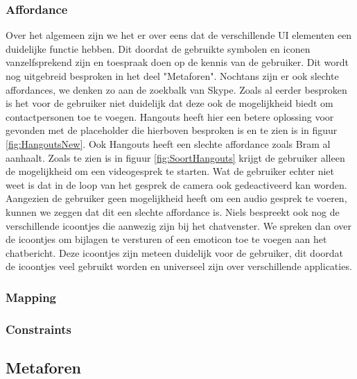 \documentclass[11pt]{article}
\begin{document}
\subsubsection{Affordance} 
Over het algemeen zijn we het er over eens dat de verschillende UI elementen een duidelijke functie hebben. Dit doordat de gebruikte symbolen en iconen vanzelfsprekend zijn en toespraak doen op de kennis van de gebruiker. Dit wordt nog uitgebreid besproken in het deel "Metaforen". 
\newline
Nochtans zijn er ook slechte affordances, we denken zo aan de zoekbalk van Skype. Zoals al eerder besproken is het voor de gebruiker niet duidelijk dat deze ook de mogelijkheid biedt om contactpersonen toe te voegen. Hangouts heeft hier een betere oplossing voor gevonden met de placeholder die hierboven besproken is en te zien is in figuur \ref{fig:HangoutsNew}.
\newline
Ook Hangouts heeft een slechte affordance zoals Bram al aanhaalt. Zoals te zien is in figuur \ref{fig:SoortHangouts} krijgt de gebruiker alleen de mogelijkheid om een videogesprek te starten. Wat de gebruiker echter niet weet is dat in de loop van het gesprek de camera ook gedeactiveerd kan worden. Aangezien de gebruiker geen mogelijkheid heeft om een audio gesprek te voeren, kunnen we zeggen dat dit een slechte affordance is. 
\newline  
Niels bespreekt ook nog de verschillende icoontjes die aanwezig zijn bij het chatvenster. We spreken dan over de icoontjes om bijlagen te versturen of een emoticon toe te voegen aan het chatbericht. Deze icoontjes zijn meteen duidelijk voor de gebruiker, dit doordat de icoontjes veel gebruikt worden en universeel zijn over verschillende applicaties.
\subsubsection{Mapping}
\subsubsection{Constraints}
\subsection{Metaforen}
\newpage
\end{document}
